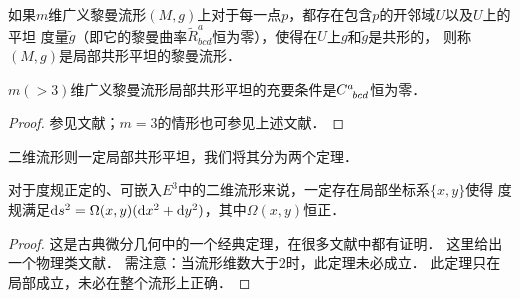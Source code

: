 
\begin{definition}
    如果$m$维广义黎曼流形$(M,g)$上对于每一点$p$，都存在包含$p$的开邻域$U$以及$U$上的平坦
    度量$\tilde{g}$（即它的黎曼曲率$\tilde{R}^a_{bcd}$恒为零），使得在$U$上$g$和$\tilde{g}$是共形的，
    则称$(M,g)$是局部{\heiti 共形平坦}的黎曼流形．
\end{definition}

\begin{theorem}\label{chrg:thm_conformal-flat}
    $m(>3)$维广义黎曼流形局部共形平坦的充要条件是$C^a_{\hphantom{a} bcd}$恒为零．
\end{theorem}
\begin{proof}
    参见文献\parencite[\S 3.3]{baizg-2004-irg}；$m= 3$的情形也可参见上述文献．
\end{proof}

二维流形则一定局部共形平坦，我们将其分为两个定理．

\begin{proposition}\label{chrg:thm_exist-oth-coord}
	对于度规正定的、可嵌入$E^3$中的二维流形来说，一定存在局部坐标系$\{x,y\}$使得
	度规满足${\rm d}s^2= \Omega(x,y)({\rm d}x^2 + {\rm d}y^2)$，其中$\Omega(x,y)$恒正．
\end{proposition}
\begin{proof}
	这是古典微分几何中的一个经典定理，在很多文献中都有证明．
	这里给出一个物理类文献\parencite[\S 11]{chandrasekhar-1983}．
	需注意：当流形维数大于$2$时，此定理未必成立．
	此定理只在{\kaishu 局部}成立，未必在整个流形上正确．   
\end{proof}

